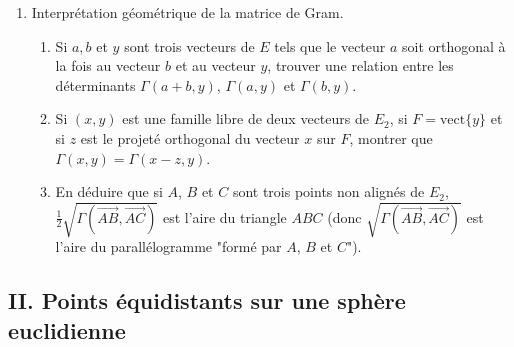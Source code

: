 \begin{enumerate}
   \item Interprétation géométrique de la matrice de Gram.
   \begin{enumerate}
     \item Si $a,b$ et $y$ sont trois vecteurs de $E$ tels que le
     vecteur $a$ soit orthogonal à la fois au vecteur $b$ et au
     vecteur $y$, trouver une relation entre les déterminants
     $\Gamma(a+b,y)$, $\Gamma(a,y)$ et $\Gamma(b,y)$.
     \item Si $(x,y)$ est une famille libre de deux vecteurs de
     $E_2$, si $F=\text{vect}\{y\}$ et si $z$ est le projeté
     orthogonal du vecteur $x$ sur $F$, montrer que
     $\Gamma(x,y)=\Gamma(x-z,y)$.
     \item En déduire que si $A$, $B$ et $C$ sont trois points non
     alignés de $E_2$, $\frac
     12\sqrt{\Gamma(\overrightarrow{AB},\overrightarrow{AC})}$ est
     l'aire du triangle $ABC$ (donc
     $\sqrt{\Gamma(\overrightarrow{AB},\overrightarrow{AC})}$ est
     l'aire du parallélogramme "formé par $A$, $B$ et $C$").
   \end{enumerate}
 \end{enumerate}


\subsection*{II. Points équidistants sur une sphère euclidienne}


